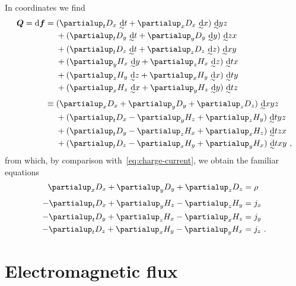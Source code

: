 \documentclass[\ifafour a4paper,12pt,\else a5paper,10pt,\fi%
onecolumn,oneside,article,%
british%
]{memoir}
\theoremstyle{remark}
\theoremstyle{innote}
\newcommand*{\de}{\partialup}%
\newcommand*{\di}{\mathrm{d}}%
\renewcommand*{\|}[1][]{\nonscript\:#1\vert\nonscript\:\mathopen{}}
\newcommand*{\tw}[2][\scriptstyle\sim]{\smash[b]{\underset{\mathclap{{}^{#1}}}{#2}}}
\newcommand*{\ti}[1][\scriptstyle\sim]{\tw[#1]{\di}}
\begin{document}
In coordinates we find
\begin{equation}
  \label{eq:d_potential_coords}
  \begin{split}
    \bm{Q} = \di\bm{f} &=
    \!\begin{aligned}[t]
     & (\de_{t}D_{x}\ \ti t + \de_{x}D_{x}\ \ti x)\ \ti yz\\
    &{}+ (\de_{t}D_{y}\ \ti t + \de_{y}D_{y}\ \ti y)\ \ti zx\\
    &{}+  (\de_{t}D_{z}\ \ti t + \de_{z}D_{z}\ \ti z)\ \ti xy\\
    &{}+ (\de_{y}H_{x}\ \ti y + \de_{z}H_{x}\ \ti z)\ \ti tx\\
    &{}+ (\de_{z}H_{y}\ \ti z + \de_{x}H_{y}\ \ti x)\ \ti ty\\
    &{}+ (\de_{x}H_{z}\ \ti x + \de_{y}H_{z}\ \ti y)\ \ti tz
    \end{aligned}
  \\[\jot]
  &\equiv
  \!\begin{aligned}[t]
&(\de_{x}D_{x} + \de_{y}D_{y} + \de_{z}D_{z})\ \ti xyz \\
  &{}+ (\de_{t}D_{x} - \de_{y}H_{z} + \de_{z}H_{y})\ \ti tyz \\
  &{}+ (\de_{t}D_{y} - \de_{z}H_{x} + \de_{x}H_{z})\ \ti tzx \\
  &{}+ (\de_{t}D_{z} - \de_{x}H_{y} + \de_{y}H_{x})\ \ti txy \ ,
\end{aligned}
  \end{split}
\end{equation}
from which, by comparison with~\eqref{eq:charge-current}, we obtain the familiar equations
\begin{equation}
  \label{eq:charge_from_potential_familiar}
  \begin{aligned}
    \de_{x}D_{x} + \de_{y}D_{y} + \de_{z}D_{z} &= \rho \\[\jot]
  -\de_{t}D_{x} + \de_{y}H_{z} - \de_{z}H_{y} &= j_{x} \\
 - \de_{t}D_{y} + \de_{z}H_{x} - \de_{x}H_{z} &=j_{y} \\
 - \de_{t}D_{z} + \de_{x}H_{y} - \de_{y}H_{x} &=j_{z} \ .
\end{aligned}
\end{equation}




\section{Electromagnetic flux}
\label{sec:electromagnetic_field}
\end{document}
